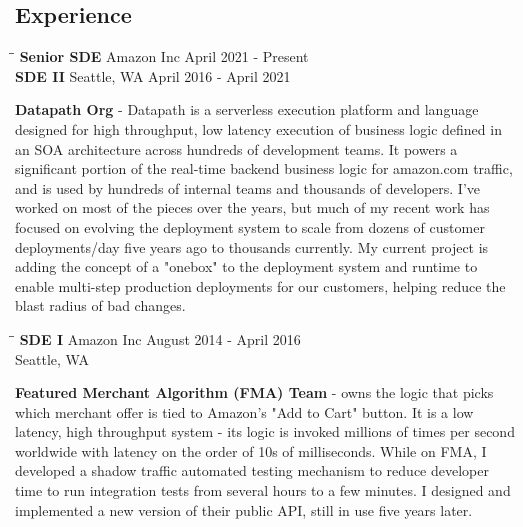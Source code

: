 \documentclass{res}
\begin{document}
\begin{resume}
\section{Experience}
   \vspace{-0.1in}
   \begin{tabbing}%
   \hspace{2.2in}\= \hspace{2.2in}\= \kill %
   {\bf Senior SDE}  \> Amazon Inc\> April 2021 - Present\\
   {\bf SDE II}          \> Seattle, WA \> April 2016 - April 2021
   \end{tabbing}\vspace{-17pt}
   {\bf Datapath Org} - Datapath is a serverless execution platform and language designed for high throughput, low latency execution of business logic defined in an SOA architecture across hundreds of development teams.  It powers a significant portion of the real-time backend business logic for amazon.com traffic, and is used by hundreds of internal teams and thousands of developers.  I've worked on most of the pieces over the years, but much of my recent work has focused on evolving the deployment system to scale from dozens of customer deployments/day five years ago to thousands currently.  My current project is adding the concept of a "onebox" to the deployment system and runtime to enable multi-step production deployments for our customers, helping reduce the blast radius of bad changes.
   \begin{tabbing}%
   \hspace{2.2in}\= \hspace{2.2in}\= \kill %
   {\bf SDE I}  \> Amazon Inc\> August 2014 - April 2016\\
                          \> Seattle, WA
   \end{tabbing}\vspace{-17pt}
   {\bf Featured Merchant Algorithm (FMA) Team} - owns the logic that picks which merchant offer is tied to Amazon's "Add to Cart" button. It is a low latency, high throughput system - its logic is invoked millions of times per second worldwide with latency on the order of 10s of milliseconds.  While on FMA, I developed a shadow traffic automated testing mechanism to reduce developer time to run integration tests from several hours to a few minutes.  I designed and implemented a new version of their public API, still in use five years later.
   \begin{tabbing}

\end{tabbing}
\end{resume}
\end{document}
